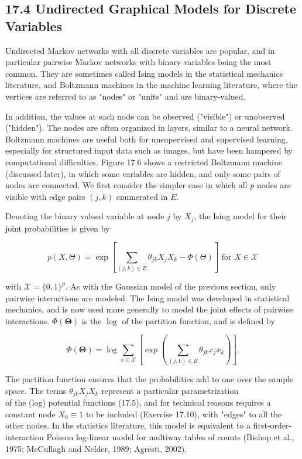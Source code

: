 \documentclass[10pt]{article}
\begin{document}
\subsection*{17.4 Undirected Graphical Models for Discrete Variables}
Undirected Markov networks with all discrete variables are popular, and in particular pairwise Markov networks with binary variables being the most common. They are sometimes called Ising models in the statistical mechanics literature, and Boltzmann machines in the machine learning literature, where the vertices are referred to as "nodes" or "units" and are binary-valued.

In addition, the values at each node can be observed ("visible") or unobserved ("hidden"). The nodes are often organized in layers, similar to a neural network. Boltzmann machines are useful both for unsupervised and supervised learning, especially for structured input data such as images, but have been hampered by computational difficulties. Figure 17.6 shows a restricted Boltzmann machine (discussed later), in which some variables are hidden, and only some pairs of nodes are connected. We first consider the simpler case in which all $p$ nodes are visible with edge pairs $(j, k)$ enumerated in $E$.

Denoting the binary valued variable at node $j$ by $X_{j}$, the Ising model for their joint probabilities is given by


\begin{equation*}
p(X, \Theta)=\exp \left[\sum_{(j, k) \in E} \theta_{j k} X_{j} X_{k}-\Phi(\Theta)\right] \text { for } X \in \mathcal{X} \tag{17.28}
\end{equation*}


with $\mathcal{X}=\{0,1\}^{p}$. As with the Gaussian model of the previous section, only pairwise interactions are modeled. The Ising model was developed in statistical mechanics, and is now used more generally to model the joint effects of pairwise interactions. $\Phi(\boldsymbol{\Theta})$ is the $\log$ of the partition function, and is defined by


\begin{equation*}
\Phi(\boldsymbol{\Theta})=\log \sum_{x \in \mathcal{X}}\left[\exp \left(\sum_{(j, k) \in E} \theta_{j k} x_{j} x_{k}\right)\right] . \tag{17.29}
\end{equation*}


The partition function ensures that the probabilities add to one over the sample space. The terms $\theta_{j k} X_{j} X_{k}$ represent a particular parametrization\\
of the (log) potential functions (17.5), and for technical reasons requires a constant node $X_{0} \equiv 1$ to be included (Exercise 17.10), with "edges" to all the other nodes. In the statistics literature, this model is equivalent to a first-order-interaction Poisson log-linear model for multiway tables of counts (Bishop et al., 1975; McCullagh and Nelder, 1989; Agresti, 2002).
\end{document}
